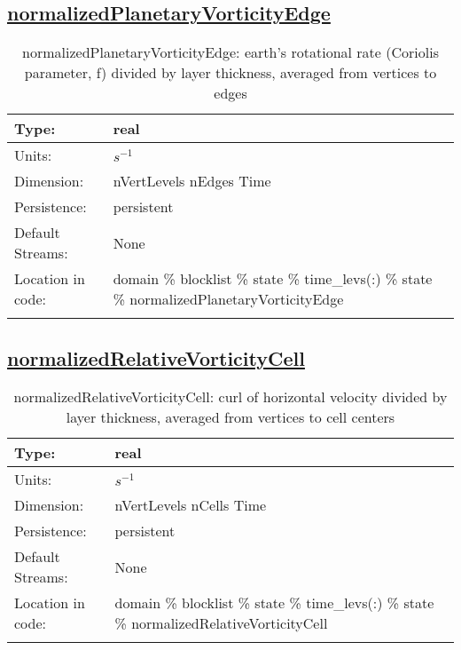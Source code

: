 \subsection[normalizedPlanetaryVorticityEdge]{\hyperref[sec:var_tab_state]{normalizedPlanetaryVorticityEdge}}
\label{subsec:var_sec_state_normalizedPlanetaryVorticityEdge}
\begin{center}
\begin{longtable}{| p{2.0in} | p{4.0in} |}
        \hline 
        Type: & real \\
        \hline 
        Units: & $s^{-1}$ \\
        \hline 
        Dimension: & nVertLevels nEdges Time \\
        \hline 
        Persistence: & persistent \\
        \hline 
		 Default Streams: & None \\
        \hline 
		 Location in code: & domain \% blocklist \% state \% time\_levs(:) \% state \% normalizedPlanetaryVorticityEdge \\
		 \hline 
    \caption{normalizedPlanetaryVorticityEdge: earth's rotational rate (Coriolis parameter, f) divided by layer thickness, averaged from vertices to edges}
\end{longtable}
\end{center}
\subsection[normalizedRelativeVorticityCell]{\hyperref[sec:var_tab_state]{normalizedRelativeVorticityCell}}
\label{subsec:var_sec_state_normalizedRelativeVorticityCell}
\begin{center}
\begin{longtable}{| p{2.0in} | p{4.0in} |}
        \hline 
        Type: & real \\
        \hline 
        Units: & $s^{-1}$ \\
        \hline 
        Dimension: & nVertLevels nCells Time \\
        \hline 
        Persistence: & persistent \\
        \hline 
		 Default Streams: & None \\
        \hline 
		 Location in code: & domain \% blocklist \% state \% time\_levs(:) \% state \% normalizedRelativeVorticityCell \\
		 \hline 
    \caption{normalizedRelativeVorticityCell: curl of horizontal velocity divided by layer thickness, averaged from vertices to cell centers}
\end{longtable}
\end{center}
